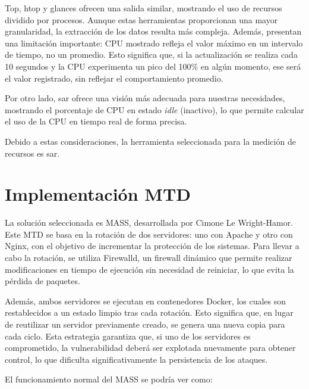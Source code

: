 Top, htop y glances ofrecen una salida similar, mostrando el uso de recursos dividido por procesos. Aunque estas herramientas proporcionan una mayor granularidad, la extracción de los datos resulta más compleja. Además, presentan una limitación importante: CPU mostrado refleja el valor máximo en un intervalo de tiempo, no un promedio. Esto significa que, si la actualización se realiza cada 10 segundos y la CPU experimenta un pico del 100\% en algún momento, ese será el valor registrado, sin reflejar el comportamiento promedio.

Por otro lado, sar ofrece una visión más adecuada para nuestras necesidades, mostrando el porcentaje de CPU en estado \textit{idle} (inactivo), lo que permite calcular el uso de la CPU en tiempo real de forma precisa.

Debido a estas consideraciones, la herramienta seleccionada para la medición de recursos es sar.


\section{Implementación MTD}
La solución seleccionada es MASS, desarrollada por Cimone Le Wright-Hamor. Este MTD se basa en la rotación de dos servidores: uno con Apache y otro con Nginx, con el objetivo de incrementar la protección de los sistemas. Para llevar a cabo la rotación, se utiliza Firewalld, un firewall dinámico que permite realizar modificaciones en tiempo de ejecución sin necesidad de reiniciar, lo que evita la pérdida de paquetes.

Además, ambos servidores se ejecutan en contenedores Docker, los cuales son restablecidos a un estado limpio tras cada rotación. Esto significa que, en lugar de reutilizar un servidor previamente creado, se genera una nueva copia para cada ciclo. Esta estrategia garantiza que, si uno de los servidores es comprometido, la vulnerabilidad deberá ser explotada nuevamente para obtener control, lo que dificulta significativamente la persistencia de los ataques.

El funcionamiento normal del MASS se podría ver como:

